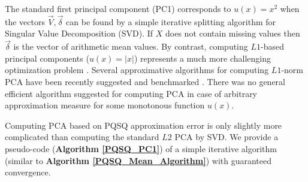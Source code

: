 \documentclass[preprint,12pt]{elsarticle}
\begin{document}
The standard first principal component (PC1) corresponds to $u(x)=x^2$ when the vectors $\vec{V}, \vec{\delta}$ can be found by a simple iterative splitting algorithm for Singular Value Decomposition (SVD). If $X$ does not contain missing values then $\vec{\delta}$ is the vector of arithmetic mean values. By contrast, computing $L1$-based principal components ($u(x)=|x|$) represents a much more challenging optimization problem \cite{Brooks2013}. Several approximative algorithms for computing $L1$-norm PCA have been recently suggested and benchmarked \cite{}. There was no general efficient algorithm suggested for computing PCA in case of arbitrary approximation measure for some monotonous function $u(x)$.

Computing PCA based on PQSQ approximation error is only slightly more complicated than computing the standard $L2$ PCA by SVD. We provide a pseudo-code (\textbf{Algorithm \ref{PQSQ_PC1}}) of a simple iterative algorithm (similar to \textbf{Algorithm \ref{PQSQ_Mean_Algorithm}}) with guaranteed convergence.
\end{document}
